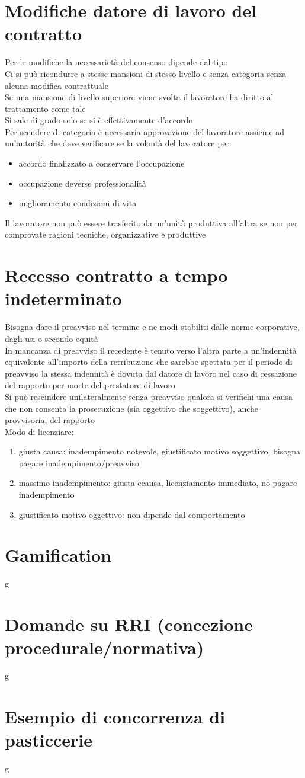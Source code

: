 \documentclass[8pt,oneside,a4paper]{article}
\begin{document}
	\section{Modifiche datore di lavoro del contratto}
	Per le modifiche la necessarietà del consenso dipende dal tipo\\
	Ci si può ricondurre a stesse mansioni di stesso livello e senza categoria senza alcuna modifica contrattuale\\
	Se una mansione di livello superiore viene svolta il lavoratore ha diritto al trattamento come tale\\
	Si sale di grado solo se si è effettivamente d'accordo\\
	Per scendere di categoria è necessaria approvazione del lavoratore assieme ad un'autorità che deve verificare se la volontà del lavoratore per:
	\begin{itemize}
		\item accordo finalizzato a conservare l'occupazione
		\item occupazione deverse professionalità
		\item miglioramento condizioni di vita
	\end{itemize}
	Il lavoratore non può essere trasferito da un'unità produttiva all'altra se non per comprovate ragioni tecniche, organizzative e produttive
	\section{Recesso contratto a tempo indeterminato}
	Bisogna dare il preavviso nel termine e ne modi stabiliti dalle norme corporative, dagli usi o secondo equità\\
	In mancanza di preavviso il recedente è tenuto verso l'altra parte a un'indennità equivalente all'importo della retribuzione che sarebbe spettata per il periodo di preavviso la stessa indennità è dovuta dal datore di lavoro nel caso di cessazione del rapporto per morte del prestatore di lavoro\\
	Si può rescindere unilateralmente senza preavviso qualora si verifichi una causa che non consenta la prosecuzione (sia oggettivo che soggettivo), anche provvisoria, del rapporto\\
	Modo di licenziare:
	\begin{enumerate}
		\item giusta causa: inadempimento notevole, giustificato motivo soggettivo, bisogna pagare inadempimento/preavviso
		\item massimo inadempimento: giusta ccausa, licenziamento immediato, no pagare inadempimento
		\item giustificato motivo oggettivo: non dipende dal comportamento
	\end{enumerate}
	\section{Gamification}
	g
	\section{Domande su RRI (concezione procedurale/normativa)}
	g
	\section{Esempio di concorrenza di pasticcerie}
	g
\end{document}
